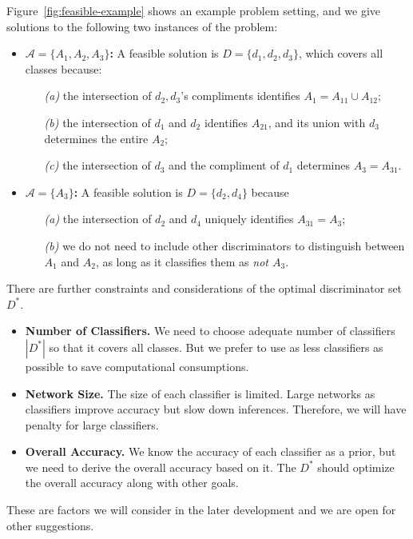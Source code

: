\documentclass[acmsmall,nonacm]{acmart}\settopmatter{}
\begin{document}
Figure~\ref{fig:feasible-example} shows an example problem setting, and we give solutions to the following two instances of the problem:
\begin{itemize}
  \item \textbf{$\mathcal{A} = \{A_1, A_2, A_3\}$:}
  A feasible solution is $D = \{d_1, d_2, d_3\}$, which covers all classes because: \begin{enumerate}
    \item[\textit{(a)}] the intersection of $d_2, d_3$'s compliments identifies $A_1 = A_{11} \cup A_{12}$;
    \item[\textit{(b)}] the intersection of $d_1$ and $d_2$ identifies $A_{21}$, and its union with $d_3$ determines the entire $A_2$;
    \item[\textit{(c)}] the intersection of $d_3$ and the compliment of $d_1$ determines $A_3 = A_{31}$.
  \end{enumerate}
  \item \textbf{$\mathcal{A} = \{A_3\}$:}
  A feasible solution is $D = \{d_2, d_4\}$ because \begin{enumerate}
    \item[\textit{(a)}] the intersection of $d_2$ and $d_4$ uniquely identifies $A_{31} = A_3$;
    \item[\textit{(b)}] we do not need to include other discriminators to distinguish between $A_1$ and $A_2$, as long as it classifies them as \textit{not $A_3$}.
  \end{enumerate}
\end{itemize}

There are further constraints and considerations of the optimal discriminator set $D^*$.
\begin{itemize}
    \item \textbf{Number of Classifiers.} We need to choose adequate number of classifiers $|D^*|$ so that it covers all classes. But we prefer to use as less classifiers as possible to save computational consumptions.
    \item \textbf{Network Size.} The size of each classifier is limited. Large networks as classifiers improve accuracy but slow down inferences. Therefore, we will have penalty for large classifiers.
    \item \textbf{Overall Accuracy.} We know the accuracy of each classifier as a prior, but we need to derive the overall accuracy based on it. The $D^*$ should optimize the overall accuracy along with other goals.
\end{itemize}
These are factors we will consider in the later development and we are open for other suggestions.
\end{document}

